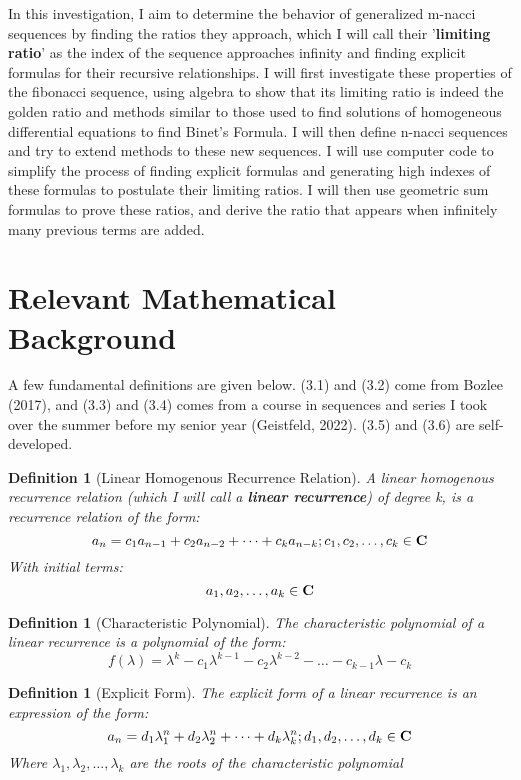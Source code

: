 \documentclass[11pt]{article}
\newtheorem{definition}[theorem]{Definition}
\begin{document}
In this investigation, I aim to determine the behavior of generalized m-nacci sequences by finding the ratios they approach, which I will call their '\textbf{limiting ratio}’ as the index of the sequence approaches infinity and finding explicit formulas for their recursive relationships. I will first investigate these properties of the fibonacci sequence, using algebra to show that its limiting ratio is indeed the golden ratio and methods similar to those used to find solutions of homogeneous differential equations to find Binet’s Formula. I will then define n-nacci sequences and try to extend methods to these new sequences. I will use computer code to simplify the process of finding explicit formulas and generating high indexes of these formulas to postulate their limiting ratios. I will then use geometric sum formulas to prove these ratios, and derive the ratio that appears when infinitely many previous terms are added. 


\section{Relevant Mathematical Background}
A few fundamental definitions are given below. (3.1) and (3.2) come from Bozlee (2017), and (3.3) and (3.4) comes from a course in sequences and series I took over the summer before my senior year (Geistfeld, 2022). (3.5) and (3.6) are self-developed.

\begin{definition}[Linear Homogenous Recurrence Relation] A linear homogenous recurrence relation (which I will call a \textbf{linear recurrence}) of degree \mbox{k}, is a recurrence relation of the form:
    $$a_n=c_1a_{n-1}+c_2a_{n-2}+\dots +c_ka_{n-k}; c_1,c_2,\dots,c_k\in \mbox{\textbf{C}}$$ 
    With initial terms: 
    $$a_1,a_2,\dots,a_k\in\mbox{\textbf{C}}$$
\end{definition}

\begin{definition}[Characteristic Polynomial] The characteristic polynomial of a linear recurrence is a polynomial of the form:
    $$f(\lambda) = \lambda^{k}-c_1\lambda^{k-1}-c_2\lambda^{k-2}-\dots-c_{k-1}\lambda-c_k$$ 
\end{definition}

\begin{definition}[Explicit Form] The explicit form of a linear recurrence is an expression of the form:
    $$a_n=d_1\lambda_1^n+d_2\lambda_2^n+\dots+d_k\lambda_k^n; d_1,d_2,\dots,d_k \in\mbox{\textbf{C}}$$ 
    Where \mbox{$\lambda_1,\lambda_2,\dots,\lambda_k$} are the roots of the characteristic polynomial
\end{definition}
\end{document}
